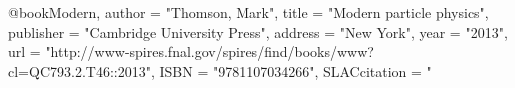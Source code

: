
@book{Modern,
      author         = "Thomson, Mark",
      title          = "{Modern particle physics}",
      publisher      = "Cambridge University Press",
      address        = "New York",
      year           = "2013",
      url            = "http://www-spires.fnal.gov/spires/find/books/www?cl=QC793.2.T46::2013",
      ISBN           = "9781107034266",
      SLACcitation   = "%
}